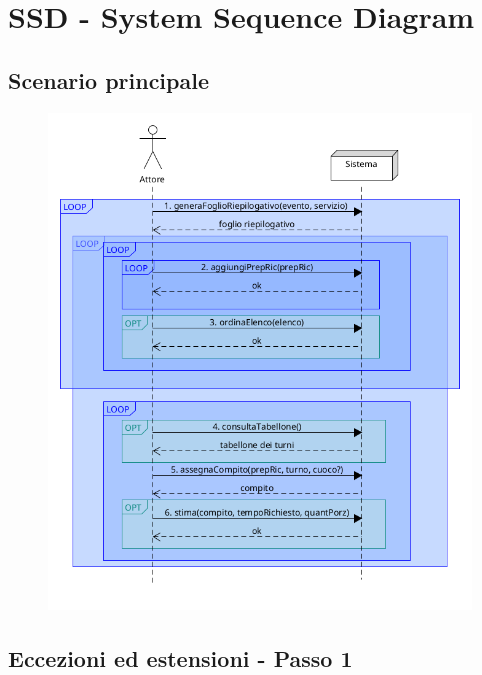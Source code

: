 \chapter{SSD - System Sequence Diagram}

\section{Scenario principale}

\begin{figure}[h]
  \begin{center}
    \includegraphics[scale = 0.47]{images/SSD/SSD - Scenario principale.png}
  \end{center}
\end{figure}

\section{Eccezioni ed estensioni - Passo 1}

